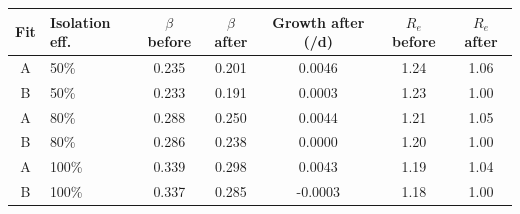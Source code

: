 \begin{tabular}{@{}clccccc@{}}
\toprule
Fit & Isolation eff. & $\beta$ before & $\beta$ after & Growth after (/d) & $R_e$ before & $R_e$ after \\
\midrule
A & 50\% & 0.235 & 0.201 & 0.0046 & 1.24 & 1.06 \\
B & 50\% & 0.233 & 0.191 & 0.0003 & 1.23 & 1.00 \\
A & 80\% & 0.288 & 0.250 & 0.0044 & 1.21 & 1.05 \\
B & 80\% & 0.286 & 0.238 & 0.0000 & 1.20 & 1.00 \\
A & 100\% & 0.339 & 0.298 & 0.0043 & 1.19 & 1.04 \\
B & 100\% & 0.337 & 0.285 & -0.0003 & 1.18 & 1.00 \\
\bottomrule
\end{tabular}
